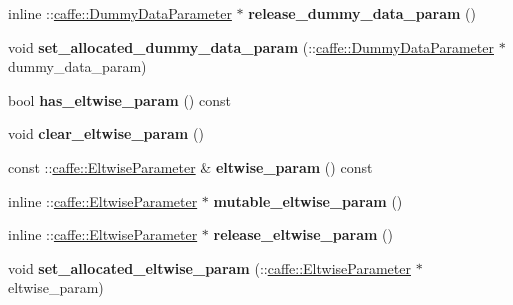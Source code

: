 \begin{DoxyCompactItemize}
\item 
\mbox{\label{classcaffe_1_1_layer_parameter_a33b5efdb40c2537368b69277a0f086e2}} 
inline \+::\mbox{\hyperlink{classcaffe_1_1_dummy_data_parameter}{caffe\+::\+Dummy\+Data\+Parameter}} $\ast$ {\bfseries release\+\_\+dummy\+\_\+data\+\_\+param} ()
\item 
\mbox{\label{classcaffe_1_1_layer_parameter_a5e5dea6732572884981c4412222163de}} 
void {\bfseries set\+\_\+allocated\+\_\+dummy\+\_\+data\+\_\+param} (\+::\mbox{\hyperlink{classcaffe_1_1_dummy_data_parameter}{caffe\+::\+Dummy\+Data\+Parameter}} $\ast$dummy\+\_\+data\+\_\+param)
\item 
\mbox{\label{classcaffe_1_1_layer_parameter_a13a5aa0e6499334d78fafa0e6150d885}} 
bool {\bfseries has\+\_\+eltwise\+\_\+param} () const
\item 
\mbox{\label{classcaffe_1_1_layer_parameter_ac0b2d3f82c67df3e5394be8200a28d54}} 
void {\bfseries clear\+\_\+eltwise\+\_\+param} ()
\item 
\mbox{\label{classcaffe_1_1_layer_parameter_ae7e1f76d8716777427c64367676a9e9c}} 
const \+::\mbox{\hyperlink{classcaffe_1_1_eltwise_parameter}{caffe\+::\+Eltwise\+Parameter}} \& {\bfseries eltwise\+\_\+param} () const
\item 
\mbox{\label{classcaffe_1_1_layer_parameter_a4da8c19c96c543cabecd8dd3853160a7}} 
inline \+::\mbox{\hyperlink{classcaffe_1_1_eltwise_parameter}{caffe\+::\+Eltwise\+Parameter}} $\ast$ {\bfseries mutable\+\_\+eltwise\+\_\+param} ()
\item 
\mbox{\label{classcaffe_1_1_layer_parameter_afc3b43f6f7dc6c06d90be6942af9b049}} 
inline \+::\mbox{\hyperlink{classcaffe_1_1_eltwise_parameter}{caffe\+::\+Eltwise\+Parameter}} $\ast$ {\bfseries release\+\_\+eltwise\+\_\+param} ()
\item 
\mbox{\label{classcaffe_1_1_layer_parameter_a6be19a06eddaaadb4d579aadf903adaf}} 
void {\bfseries set\+\_\+allocated\+\_\+eltwise\+\_\+param} (\+::\mbox{\hyperlink{classcaffe_1_1_eltwise_parameter}{caffe\+::\+Eltwise\+Parameter}} $\ast$eltwise\+\_\+param)

\end{DoxyCompactItemize}
